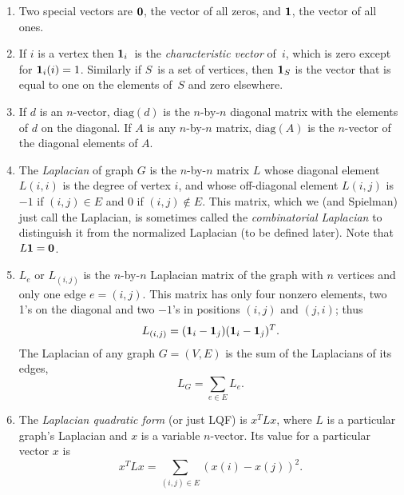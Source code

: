 \documentclass[11pt]{article}
\newcommand{\m}[1]{{\bf{#1}}}       %
\newcommand{\ones}{\m1}             %
\newcommand{\zeros}{\m0}            %
\newcommand{\diag}{\mbox{diag}}
\begin{document}
\begin{enumerate}
\item
Two special vectors are $\zeros$, the vector of all zeros,
and $\ones$, the vector of all ones.

\item
If $i$ is a vertex then $\ones_i$~is the 
{\em characteristic vector} of~$i$, which
is zero except for $\ones_i(i)=1$.
Similarly if $S$~is a set of vertices, 
then $\ones_S$ is the vector that is equal to one
on the elements of~$S$ and zero elsewhere.

\item
If $d$ is an $n$-vector, $\diag(d)$ is the $n$-by-$n$ diagonal 
matrix with the elements of $d$ on the diagonal.
If $A$ is any $n$-by-$n$ matrix, $\diag(A)$ is the $n$-vector
of the diagonal elements of $A$.

\item\label{lap}
The {\em Laplacian} of graph $G$ is the $n$-by-$n$ matrix $L$
whose diagonal element $L(i,i)$ is the degree of vertex $i$, 
and whose off-diagonal element $L(i,j)$ is~$-1$ if $(i,j) \in E$ 
and $0$ if $(i,j) \notin E$.
This matrix, which we (and Spielman) just call the Laplacian,
is sometimes called the {\em combinatorial Laplacian} to 
distinguish it from the normalized Laplacian 
(to be defined later).
Note that $ L\ones = \zeros$.

\item
$L_e$ or $L_{(i,j)}$ is the $n$-by-$n$ Laplacian matrix
of the graph with $n$ vertices and only one edge $e = (i,j)$.
This matrix has only four nonzero elements, two 1's on the
diagonal and two $-1$'s in positions $(i,j)$ and $(j,i)$;
thus 
$$L_{(i,j)}=(\ones_i-\ones_j)(\ones_i-\ones_j)^T.$$
The Laplacian of any graph $G=(V,E)$ is the sum of the Laplacians
of its edges,
$$L_G = \sum_{e\in E} L_e.$$

\item
The {\em Laplacian quadratic form} (or just LQF) is $x^TLx$,
where $L$ is a particular graph's Laplacian and $x$ is a variable $n$-vector.
Its value for a particular vector $x$ is 
$$x^TLx = \sum_{(i,j)\in E}(x(i)-x(j))^2.$$

\end{enumerate}
\end{document}
